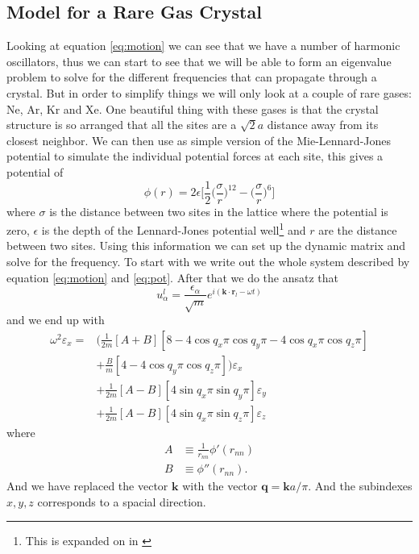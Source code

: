 \documentclass[11pt]{article}
\begin{document}
\subsection{Model for a Rare Gas Crystal}
Looking at equation \ref{eq:motion} we can see that we have a number of harmonic oscillators, thus we can start to see that we will be able to form an eigenvalue problem to solve for the different frequencies that can propagate through a crystal. But in order to simplify things we will only look at a couple of rare gases: Ne, Ar, Kr and Xe. One beautiful thing with these gases is that the crystal structure is so arranged that all the sites are a $\sqrt{2}a$ distance away from its closest neighbor. We can then use as simple version of the Mie-Lennard-Jones potential to simulate the individual potential forces at each site, this gives a potential of
\begin{equation}
	\phi(r) = 2 \epsilon \big[\frac{1}{2} \big(\frac{\sigma}{r}\big)^{12} - \big(\frac{\sigma}{r}\big)^6\big]
	\label{eq:pot}
\end{equation}
where $\sigma$ is the distance between two sites in the lattice where the potential is zero, $\epsilon$ is the depth of the Lennard-Jones potential well\footnote{This is expanded on in \cite{bib:wiki:mlj}} and $r$ are the distance between two sites. Using this information we can set up the dynamic matrix and solve for the frequency. To start with we write out the whole system described by equation \ref{eq:motion} and \ref{eq:pot}. After that we do the ansatz that 
\begin{equation}
	u^l_{\alpha} = \frac{\epsilon_{\alpha}}{\sqrt{m}}e^{i(\mathbf{k}\cdot\mathbf{r}_l-\omega t)}
	\label{eq:ansatz}
\end{equation}
and we end up with 
\begin{align}
	\omega^2\varepsilon_x = &\big( \frac{1}{2m} [A+B][8-4\cos{q_x\pi}\cos{q_y\pi}-4\cos{q_x\pi}\cos{q_z\pi}] \\
	&+ \frac{B}{m}[4-4\cos{q_y\pi}\cos{q_z\pi}]\big)\varepsilon_x \\
	&+\frac{1}{2m}[A-B][4\sin{q_x\pi}\sin{q_y\pi}]\varepsilon_y \\
	&+\frac{1}{2m}[A-B][4\sin{q_x\pi}\sin{q_z\pi}]\varepsilon_z
	\label{eq:omega}
\end{align}
where
\begin{align}
	A &\equiv \frac{1}{r_{nn}} \phi'(r_{nn}) \\
	B &\equiv \phi''(r_{nn}).
	\label{eq:AB}
\end{align}
And we have replaced the vector $\mathbf{k}$ with the vector $\mathbf{q} = \mathbf{k}a/\pi$. And the subindexes $x,y,z$ corresponds to a spacial direction.
\end{document}

